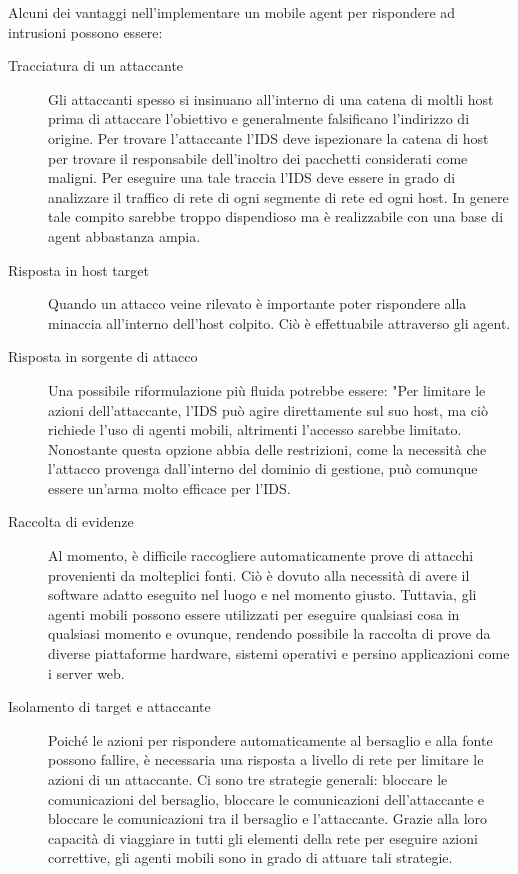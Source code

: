 Alcuni dei vantaggi nell'implementare un mobile agent per rispondere ad intrusioni possono essere:
\begin{description}
    \item [Tracciatura di un attaccante] Gli attaccanti spesso si insinuano all'interno di una catena di moltli host prima di attaccare l'obiettivo e generalmente falsificano l'indirizzo di origine. Per trovare l'attaccante l'IDS deve ispezionare la catena di host per trovare il responsabile dell'inoltro dei pacchetti considerati come maligni. Per eseguire una tale traccia l'IDS deve essere in grado di analizzare il traffico di rete di ogni segmente di rete ed ogni host. In genere tale compito sarebbe troppo dispendioso ma è realizzabile  con una base di agent abbastanza ampia.
    \item [Risposta in host target] Quando un attacco veine rilevato è importante poter rispondere alla minaccia all'interno dell'host colpito. Ciò è effettuabile attraverso gli agent.
    \item [Risposta in sorgente di attacco] Una possibile riformulazione più fluida potrebbe essere: "Per limitare le azioni dell'attaccante, l'IDS può agire direttamente sul suo host, ma ciò richiede l'uso di agenti mobili, altrimenti l'accesso sarebbe limitato. Nonostante questa opzione abbia delle restrizioni, come la necessità che l'attacco provenga dall'interno del dominio di gestione, può comunque essere un'arma molto efficace per l'IDS.
    \item [Raccolta di evidenze] Al momento, è difficile raccogliere automaticamente prove di attacchi provenienti da molteplici fonti. Ciò è dovuto alla necessità di avere il software adatto eseguito nel luogo e nel momento giusto. Tuttavia, gli agenti mobili possono essere utilizzati per eseguire qualsiasi cosa in qualsiasi momento e ovunque, rendendo possibile la raccolta di prove da diverse piattaforme hardware, sistemi operativi e persino applicazioni come i server web. 
    \item[Isolamento di target e attaccante] Poiché le azioni per rispondere automaticamente al bersaglio e alla fonte possono fallire, è necessaria  una risposta a livello di rete per limitare le azioni di un attaccante. Ci sono tre strategie generali: bloccare le comunicazioni del bersaglio, bloccare le comunicazioni dell'attaccante e bloccare le comunicazioni tra il bersaglio e l'attaccante. Grazie alla loro capacità di viaggiare in tutti gli elementi della rete per eseguire azioni correttive, gli agenti mobili sono in grado di attuare tali strategie.
\end{description}

